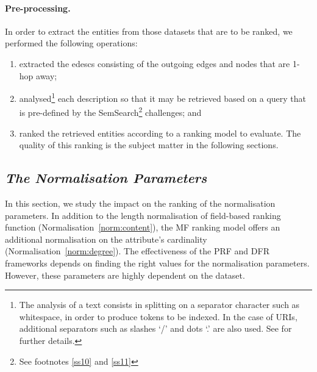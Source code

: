 \paragraph{Pre-processing.}

In order to extract the entities from those datasets that are to be ranked, we performed the following operations:
\begin{enumerate}
	\item extracted the \glspl{edesc} consisting of the outgoing edges and nodes that are 1-hop away;
	\item analysed\footnote{The analysis of a text consists in splitting on a separator character such as whitespace, in order to produce tokens to be indexed. In the case of URIs, additional separators such as slashes `/' and dots `.' are also used. See \cite{McCandless:2010:LAS,buttcher:2016:information} for further details.} each description so that it may be retrieved based on a query that is pre-defined by the SemSearch\footnote{See footnotes \ref{ss10} and \ref{ss11}} challenges; and
	\item ranked the retrieved entities according to a ranking model to evaluate. The quality of this ranking is the subject matter in the following sections.
\end{enumerate}

%

\subsection{\emph{The Normalisation Parameters}}
\label{sec:norm-exp}

In this section, we study the impact on the ranking of the normalisation parameters. In addition to the length normalisation of field-based ranking function (Normalisation~\ref{norm:content}), the \gls{MF} ranking model offers an additional normalisation on the attribute's cardinality (Normalisation~\ref{norm:degree}). The effectiveness of the PRF and DFR frameworks depends on finding the right values for the normalisation parameters. However, these parameters are highly dependent on the dataset.\\

